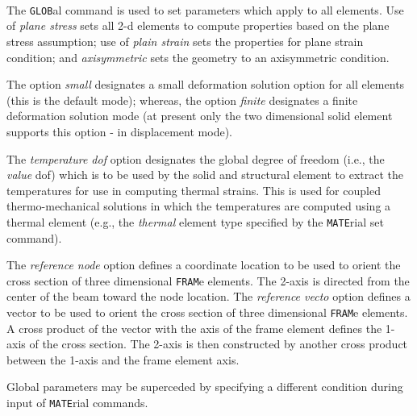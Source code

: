  \\{\smallskip}
 \\{\smallskip}
 \\{\smallskip}
 \\{\smallskip}
 \\{\smallskip}
 \\{\smallskip}
 \\{\smallskip}
 \\{\smallskip}
\headb

The {\tt GLOB}al command is used to set parameters which apply to
all elements.  Use of {\it plane stress} sets all 2-d elements
to compute properties based on the plane stress assumption; use
of {\it plain strain} sets the properties for plane strain condition;
and {\it axisymmetric} sets the geometry to an axisymmetric condition.

The option {\it small} designates a small deformation solution option
for all elements (this is the default mode); whereas, the option {\it finite}
designates a finite deformation solution mode (at present only the
two dimensional solid element supports this option - in displacement mode).

The {\it temperature dof} option designates the global degree of
freedom (i.e., the {\it value} dof) which is to be used by the solid and
structural element to extract the temperatures for use in
computing thermal strains.  This is used for coupled thermo-mechanical
solutions in which the temperatures are computed using a thermal element
(e.g., the {\it thermal} element type specified by the {\tt MATE}rial set
command).

The {\it reference node} option defines a coordinate location to be
used to orient the cross section of three dimensional {\tt FRAM}e elements.
The 2-axis is directed from the center of the beam toward the node location.
The {\it reference vecto} option defines a vector to be
used to orient the cross section of three dimensional {\tt FRAM}e elements.
A cross product of the vector with the axis of the frame element defines
the 1-axis of the cross section.  The 2-axis is then constructed by another
cross product between the 1-axis and the frame element axis.

Global parameters may be superceded by specifying a different condition
during input of {\tt MATE}rial commands.
\vfil\eject
